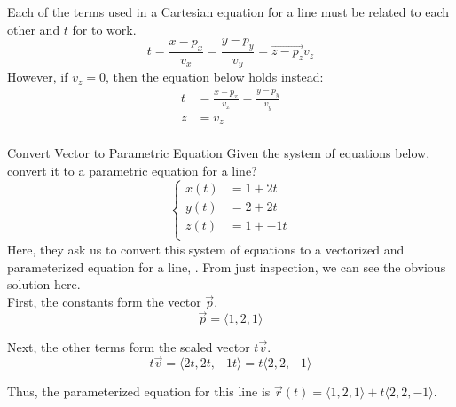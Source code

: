 Each of the terms used in a Cartesian equation for a line must be related to each other and $t$ for  to work.
\begin{equation}\label{eq:Parametric_Cartesian_Line}
  t = \frac{x-p_{x}}{v_{x}} = \frac{y-p_{y}}{v_{y}} = \vec{z-p_{z}}{v_{z}}
\end{equation}
However, if $v_{z} = 0$, then the equation below holds instead:
\begin{equation*}
  \begin{aligned}
    t &= \frac{x-p_{x}}{v_{x}} = \frac{y-p_{y}}{v_{y}} \\
    z &= v_{z} \\
\end{aligned}
\end{equation*}

\begin{example}[Lecture 4]{Convert Vector to Parametric Equation}
  Given the system of equations below, convert it to a parametric equation for a line?
  \begin{equation*}
    \begin{cases}
      x(t) &= 1 + 2t \\
      y(t) &= 2 + 2t \\
      z(t) &= 1 + -1t \\
    \end{cases}
  \end{equation*}
  \tcblower{}
  Here, they ask us to convert this system of equations to a vectorized and parameterized equation for a line, .
  From just inspection, we can see the obvious solution here. \\
  First, the constants form the vector $\vec{p}$.
  \begin{equation*}
    \vec{p} = \langle 1, 2, 1 \rangle
  \end{equation*}

  Next, the other terms form the scaled vector $t\vec{v}$.
  \begin{equation*}
    t\vec{v} = \langle 2t, 2t, -1t \rangle = t \langle 2, 2, -1 \rangle
  \end{equation*}

  Thus, the parameterized equation for this line is $\vec{r}(t) = \langle 1, 2, 1 \rangle + t \langle 2, 2, -1 \rangle$.
\end{example}



